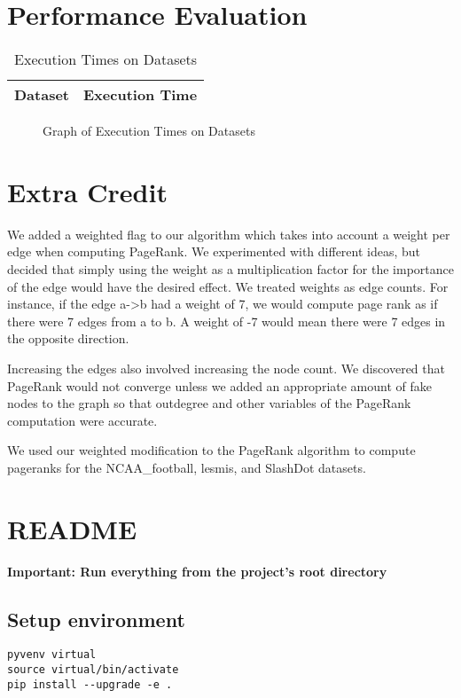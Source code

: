 \documentclass{report}
\begin{document}
\section{Performance Evaluation}
\begin{table}
  \centering
  \begin{tabular}{}
    \toprule
    Dataset & Execution Time\\
    \midrule
    \bottomrule
  \end{tabular}
  \caption{Execution Times on Datasets}
  \label{execution-times-table}
\end{table}
\begin{figure}
  \centering
  
  \caption{Graph of Execution Times on Datasets}
  \label{execution-times-graph}
\end{figure}

\section{Extra Credit}
We added a weighted flag to our algorithm which takes into account a weight per
edge when computing PageRank. We experimented with different ideas, but decided
that simply using the weight as a multiplication factor for the importance of
the edge would have the desired effect. We treated weights as edge counts.  For
instance, if the edge a->b had a weight of 7, we would compute page rank as if
there were 7 edges from a to b. A weight of -7 would mean there were 7 edges in
the opposite direction.

Increasing the edges also involved increasing the node count. We discovered that
PageRank would not converge unless we added an appropriate amount of fake nodes
to the graph so that outdegree and other variables of the PageRank computation
were accurate.

We used our weighted modification to the PageRank algorithm to compute pageranks
for the NCAA\_football, lesmis, and SlashDot datasets.


\appendix

\section{README}
\lstset{lang=bash}
\textbf{Important: Run everything from the project's root directory}

\subsection{Setup environment}
\begin{lstlisting}
pyvenv virtual
source virtual/bin/activate
pip install --upgrade -e .
\end{lstlisting}
\end{document}
